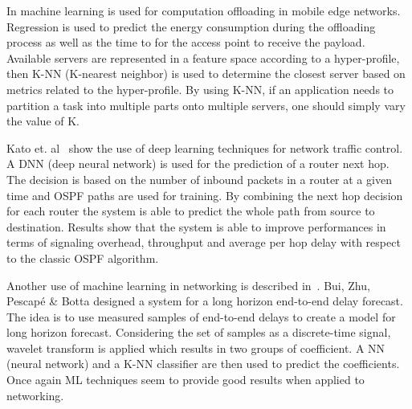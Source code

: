 In \cite{crutcher2017hyperprofile} machine learning is used for computation offloading in mobile edge networks. Regression is used to predict the energy consumption during the offloading process as well as the time to for the access point to receive the payload. Available servers are represented in a feature space according to a hyper-profile, then K-NN (K-nearest neighbor) is used to determine the closest server based on metrics related to the hyper-profile. By using K-NN, if an application needs to partition a task into multiple parts onto multiple servers, one should simply vary the value of K. 

Kato et. al~\cite{deep_learning_heterogeneus} show the use of deep learning techniques for network traffic control. A DNN (deep neural network) is used for the prediction of a router next hop. The decision is based on the number of inbound packets in a router at a given time and OSPF paths are used for training. By combining the next hop decision for each router the system is able to predict the whole path from source to destination. Results show that the system is able to improve performances in terms of signaling overhead, throughput and average per hop delay with respect to the classic OSPF algorithm.

Another use of machine learning in networking is described in~\cite{end-to-end}. Bui, Zhu, Pescapé \& Botta designed a system for a long horizon end-to-end delay forecast. The idea is to use measured samples of end-to-end delays to create a model for long horizon forecast. Considering the set of samples as a discrete-time signal, wavelet transform is applied which results in two groups of coefficient. A NN (neural network) and a K-NN classifier are then used to predict the coefficients. Once again ML techniques seem to provide good results when applied to networking.